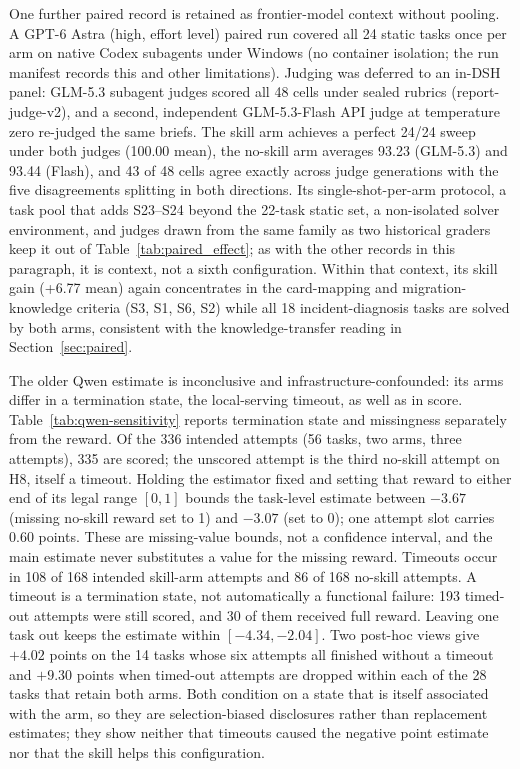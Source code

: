 \documentclass[11pt]{article}
\begin{document}
One further paired record is retained as frontier-model context without pooling. A GPT-6 Astra (high, effort level) paired run covered all 24 static tasks once per arm on native Codex subagents under Windows (no container isolation; the run manifest records this and other limitations). Judging was deferred to an in-DSH panel: GLM-5.3 subagent judges scored all 48 cells under sealed rubrics (report-judge-v2), and a second, independent GLM-5.3-Flash API judge at temperature zero re-judged the same briefs. The skill arm achieves a perfect 24/24 sweep under both judges (100.00 mean), the no-skill arm averages 93.23 (GLM-5.3) and 93.44 (Flash), and 43 of 48 cells agree exactly across judge generations with the five disagreements splitting in both directions. Its single-shot-per-arm protocol, a task pool that adds S23--S24 beyond the 22-task static set, a non-isolated solver environment, and judges drawn from the same family as two historical graders keep it out of Table~\ref{tab:paired_effect}; as with the other records in this paragraph, it is context, not a sixth configuration. Within that context, its skill gain (+6.77 mean) again concentrates in the card-mapping and migration-knowledge criteria (S3, S1, S6, S2) while all 18 incident-diagnosis tasks are solved by both arms, consistent with the knowledge-transfer reading in Section~\ref{sec:paired}.

The older Qwen estimate is inconclusive and infrastructure-confounded: its arms differ in a termination state, the local-serving timeout, as well as in score. Table~\ref{tab:qwen-sensitivity} reports termination state and missingness separately from the reward. Of the 336 intended attempts (56 tasks, two arms, three attempts), 335 are scored; the unscored attempt is the third no-skill attempt on H8, itself a timeout. Holding the estimator fixed and setting that reward to either end of its legal range $[0,1]$ bounds the task-level estimate between $-3.67$ (missing no-skill reward set to 1) and $-3.07$ (set to 0); one attempt slot carries 0.60 points. These are missing-value bounds, not a confidence interval, and the main estimate never substitutes a value for the missing reward. Timeouts occur in 108 of 168 intended skill-arm attempts and 86 of 168 no-skill attempts. A timeout is a termination state, not automatically a functional failure: 193 timed-out attempts were still scored, and 30 of them received full reward. Leaving one task out keeps the estimate within $[-4.34, -2.04]$. Two post-hoc views give $+4.02$ points on the 14 tasks whose six attempts all finished without a timeout and $+9.30$ points when timed-out attempts are dropped within each of the 28 tasks that retain both arms. Both condition on a state that is itself associated with the arm, so they are selection-biased disclosures rather than replacement estimates; they show neither that timeouts caused the negative point estimate nor that the skill helps this configuration.
\end{document}
